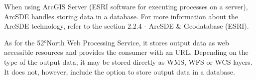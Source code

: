 When using ArcGIS Server (ESRI software for executing processes on a server), ArcSDE handles storing data in a database. For more information about the ArcSDE technology, refer to the section 2.2.4 - ArcSDE \& Geodatabase (ESRI).

As for the 52°North Web Processing Service, it stores output data as web accessible resources and provides the consumer with an URL. Depending on the type of the output data, it may be stored directly as WMS, WFS or WCS layers.\cite{north} It does not, however, include the option to store output data in a database.